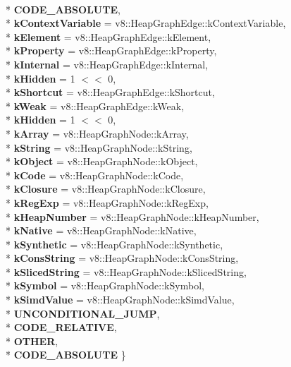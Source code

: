 \begin{DoxyCompactItemize}
\\*
{\bfseries C\+O\+D\+E\+\_\+\+A\+B\+S\+O\+L\+U\+TE}, 
\\*
{\bfseries k\+Context\+Variable} = v8\+:\+:Heap\+Graph\+Edge\+:\+:k\+Context\+Variable, 
\\*
{\bfseries k\+Element} = v8\+:\+:Heap\+Graph\+Edge\+:\+:k\+Element, 
\\*
{\bfseries k\+Property} = v8\+:\+:Heap\+Graph\+Edge\+:\+:k\+Property, 
\\*
{\bfseries k\+Internal} = v8\+:\+:Heap\+Graph\+Edge\+:\+:k\+Internal, 
\\*
{\bfseries k\+Hidden} = 1 $<$$<$ 0, 
\\*
{\bfseries k\+Shortcut} = v8\+:\+:Heap\+Graph\+Edge\+:\+:k\+Shortcut, 
\\*
{\bfseries k\+Weak} = v8\+:\+:Heap\+Graph\+Edge\+:\+:k\+Weak, 
\\*
{\bfseries k\+Hidden} = 1 $<$$<$ 0, 
\\*
{\bfseries k\+Array} = v8\+:\+:Heap\+Graph\+Node\+:\+:k\+Array, 
\\*
{\bfseries k\+String} = v8\+:\+:Heap\+Graph\+Node\+:\+:k\+String, 
\\*
{\bfseries k\+Object} = v8\+:\+:Heap\+Graph\+Node\+:\+:k\+Object, 
\\*
{\bfseries k\+Code} = v8\+:\+:Heap\+Graph\+Node\+:\+:k\+Code, 
\\*
{\bfseries k\+Closure} = v8\+:\+:Heap\+Graph\+Node\+:\+:k\+Closure, 
\\*
{\bfseries k\+Reg\+Exp} = v8\+:\+:Heap\+Graph\+Node\+:\+:k\+Reg\+Exp, 
\\*
{\bfseries k\+Heap\+Number} = v8\+:\+:Heap\+Graph\+Node\+:\+:k\+Heap\+Number, 
\\*
{\bfseries k\+Native} = v8\+:\+:Heap\+Graph\+Node\+:\+:k\+Native, 
\\*
{\bfseries k\+Synthetic} = v8\+:\+:Heap\+Graph\+Node\+:\+:k\+Synthetic, 
\\*
{\bfseries k\+Cons\+String} = v8\+:\+:Heap\+Graph\+Node\+:\+:k\+Cons\+String, 
\\*
{\bfseries k\+Sliced\+String} = v8\+:\+:Heap\+Graph\+Node\+:\+:k\+Sliced\+String, 
\\*
{\bfseries k\+Symbol} = v8\+:\+:Heap\+Graph\+Node\+:\+:k\+Symbol, 
\\*
{\bfseries k\+Simd\+Value} = v8\+:\+:Heap\+Graph\+Node\+:\+:k\+Simd\+Value, 
\\*
{\bfseries U\+N\+C\+O\+N\+D\+I\+T\+I\+O\+N\+A\+L\+\_\+\+J\+U\+MP}, 
\\*
{\bfseries C\+O\+D\+E\+\_\+\+R\+E\+L\+A\+T\+I\+VE}, 
\\*
{\bfseries O\+T\+H\+ER}, 
\\*
{\bfseries C\+O\+D\+E\+\_\+\+A\+B\+S\+O\+L\+U\+TE}
 \}\hypertarget{classv8_1_1internal_1_1_b_a_s_e___e_m_b_e_d_d_e_d_a86d4e2d8815ac6f9c09a8ff25971ffb9}{}\label{classv8_1_1internal_1_1_b_a_s_e___e_m_b_e_d_d_e_d_a86d4e2d8815ac6f9c09a8ff25971ffb9}


\end{DoxyCompactItemize}
